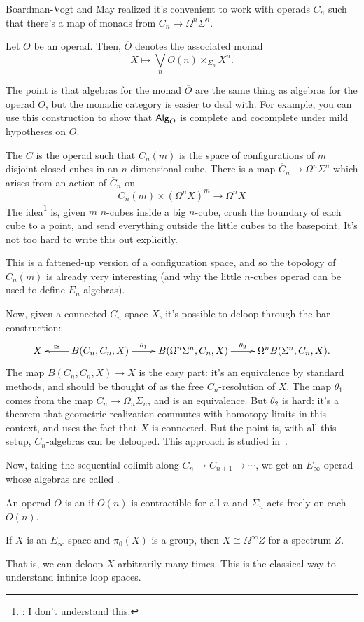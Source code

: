 Boardman-Vogt and May realized it's convenient to work with operads $C_n$ such that there's a map of monads from
$\overline C_n\to\Omega^n\Sigma^n$.
\begin{defn}
Let $O$ be an operad. Then, $\overline O$ denotes the associated monad
\[X\mapsto\bigvee_n O(n)\times_{\Sigma_n} X^n.\]
\end{defn}
The point is that algebras for the monad $\overline O$ are the same thing as algebras for the operad $O$, but the
monadic category is easier to deal with. For example, you can use this construction to show that $\mathsf{Alg}_O$ is
complete and cocomplete under mild hypotheses on $O$.
\begin{exm}
The  $C$ is the operad such that $C_n(m)$ is the space of configurations of $m$
disjoint closed cubes in an $n$-dimensional cube. There is a map $\overline C_n\to\Omega^n\Sigma^n$ which arises
from an action of $\overline C_n$ on
\[C_n(m)\times (\Omega^n X)^m\to \Omega^n X\]
The idea\footnote{\TODO: I don't understand this.} is, given $m$ $n$-cubes inside a big $n$-cube, crush the
boundary of each cube to a point, and send everything outside the little cubes to the basepoint. It's not too hard
to write this out explicitly.
\end{exm}
This is a fattened-up version of a configuration space, and so the topology of $C_n(m)$ is already very interesting
(and why the little $n$-cubes operad can be used to define $E_n$-algebras).

Now, given a connected $C_n$-space $X$, it's possible to deloop through the bar construction:
\[\xymatrix{
	X & B(C_n,C_n,X)\ar[l]_-\simeq\ar[r]^-{\theta_1} & B(\Omega^n\Sigma^n, C_n, X)\ar[r]^-{\theta_2} &\Omega^n
	B(\Sigma^n, C_n, X).
}\]
The map $B(C_n,C_n, X)\to X$ is the easy part: it's an equivalence by standard methods, and should be thought of as
the free $C_n$-resolution of $X$. The map $\theta_1$ comes from the map $C_n\to\Omega_n\Sigma_n$, and is an
equivalence. But $\theta_2$ is hard: it's a theorem that geometric realization commutes with homotopy limits in
this context, and uses the fact that $X$ is connected. But the point is, with all this setup, $C_n$-algebras can be
delooped. This approach is studied in~\cite{MayGILS}.

Now, taking the sequential colimit along $C_n\to C_{n+1}\to\dotsb$, we get an $E_\infty$-operad whose algebras are
called .
\begin{defn}
An operad $O$ is an  if $O(n)$ is contractible for all
$n$ and $\Sigma_n$ acts freely on each $O(n)$.
\end{defn}
\begin{thm}
If $X$ is an $E_\infty$-space and $\pi_0(X)$ is a group, then $X\cong\Omega^\infty Z$ for a spectrum $Z$.
\end{thm}
That is, we can deloop $X$ arbitrarily many times. This is the classical way to understand infinite loop spaces.

